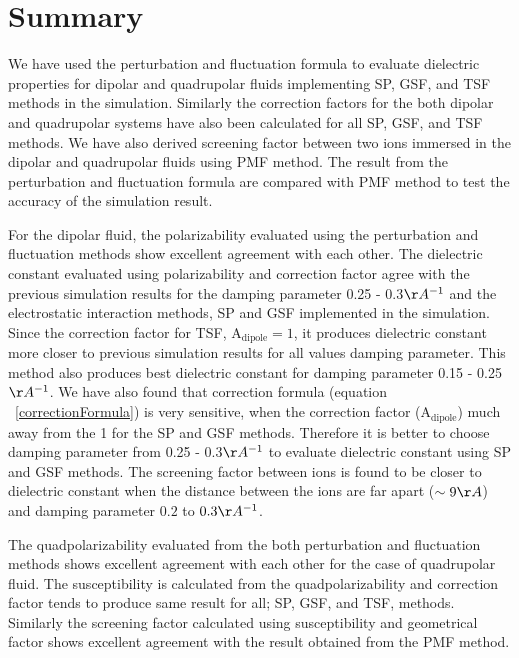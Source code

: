 \section{Summary}
We have used the perturbation and fluctuation formula to evaluate dielectric properties for dipolar and quadrupolar fluids implementing SP, GSF, and TSF methods in the simulation. Similarly the correction factors for the both dipolar and quadrupolar systems have also been calculated for all SP, GSF, and TSF methods.  We have also derived screening factor between two ions immersed in the dipolar and quadrupolar fluids using PMF method. The result from the perturbation and fluctuation formula are compared with PMF method to test the accuracy of the simulation result. 

For the dipolar fluid, the polarizability evaluated using the perturbation and fluctuation methods show excellent agreement with each other. The dielectric constant evaluated using polarizability and correction factor agree with the previous simulation results \cite{NeumannI83} for the damping parameter 0.25 - 0.3$\AA^{-1}$ and the electrostatic interaction methods, SP and GSF implemented in the simulation. Since the correction factor for TSF, $\mathrm{A_{dipole}} = 1$, it produces dielectric constant more closer to previous simulation results \cite{NeumannI83} for all values damping parameter. This method also produces best dielectric constant for damping parameter 0.15 - 0.25$\AA^{-1}$. We have also found that correction formula (equation ~\ref{correctionFormula}) is very sensitive, when the correction factor ($\mathrm{A_{dipole}}$) much away from the 1 for the SP and GSF methods. Therefore it is better to choose damping parameter from 0.25 - 0.3$\AA^{-1}$ to evaluate dielectric constant using SP and GSF methods. The screening factor between ions is found to be closer to dielectric constant when the distance between the ions are far apart ($\sim 9 \AA$) and damping parameter $0.2$ to $0.3 \AA^{-1}$.

The quadpolarizability evaluated from the both perturbation and fluctuation methods shows excellent agreement with each other for the case of quadrupolar fluid. The susceptibility is calculated from the quadpolarizability and correction factor tends to produce same result for all; SP, GSF, and TSF, methods. Similarly the screening factor calculated using susceptibility and geometrical factor shows excellent agreement with the result obtained from the PMF method.

%
% 
% 
